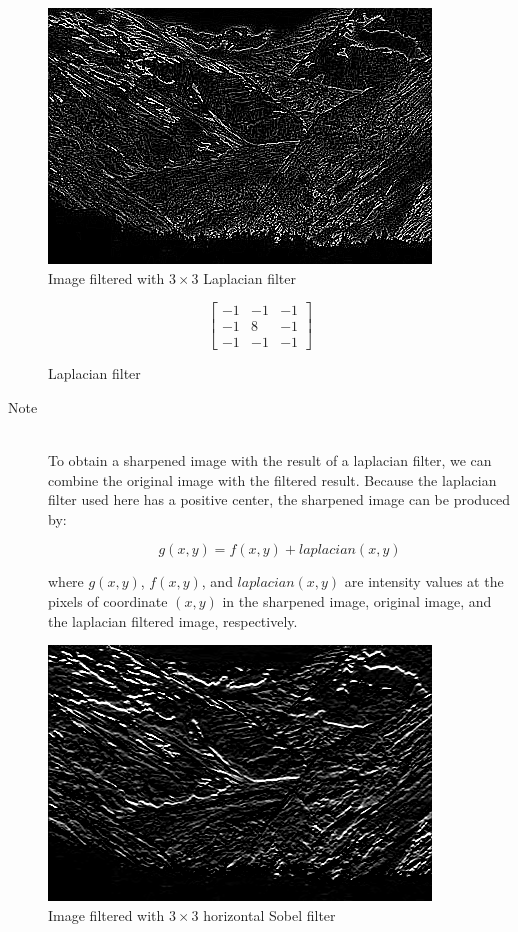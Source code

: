 \documentclass{article}
\begin{document}
\begin{figure}[H]
	\centering
	\includegraphics[width=288pt]{../result/filter-laplacian.png}
	\caption{Image filtered with $3 \times 3$ Laplacian filter}
\end{figure}

\begin{figure}[H]
	\centering
		\[ \begin{bmatrix}
			-1 & -1 & -1 \\
			-1 &  8 & -1 \\
			-1 & -1 & -1
		\end{bmatrix} \]
\caption{Laplacian filter}
\end{figure}

\begin{description}
\item[Note] \hfill \\
To obtain a sharpened image with the result of a laplacian filter, we can combine the original image with the filtered result. Because the laplacian filter used here has a positive center, the sharpened image can be produced by:

$$g(x,y) = f(x, y) + laplacian(x, y)$$

where $g(x, y)$, $f(x, y)$, and $laplacian(x, y)$ are intensity values at the pixels of coordinate $(x, y)$ in the sharpened image, original image, and the laplacian filtered image, respectively.
\end{description}

\begin{figure}[H]
	\centering
	\includegraphics[width=288pt]{../result/filter-sobel-0.png}
	\caption{Image filtered with $3 \times 3$ horizontal Sobel filter}
\end{figure}
\end{document}
